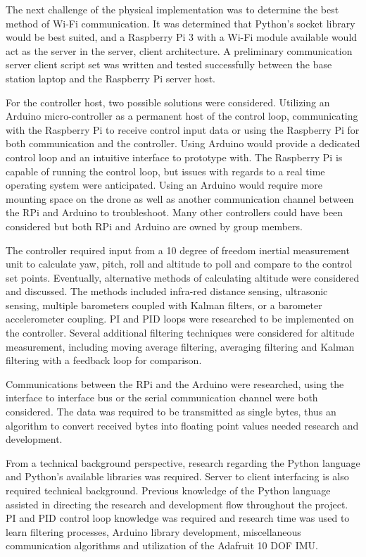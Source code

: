 The next challenge of the physical implementation was to determine the best method of Wi-Fi communication. It was determined that Python's socket library would be best suited, and a Raspberry Pi 3 with a Wi-Fi module available would act as the server in the server, client architecture. A preliminary communication server client script set was written and tested successfully between the base station laptop and the Raspberry Pi server host. 

For the controller host, two possible solutions were considered. Utilizing an Arduino micro-controller as a permanent host of the control loop, communicating with the Raspberry Pi to receive control input data or using the Raspberry Pi for both communication and the controller. Using Arduino would provide a dedicated control loop and an intuitive interface to prototype with. The Raspberry Pi is capable of running the control loop, but issues with regards to a real time operating system were anticipated. Using an Arduino would require more mounting space on the drone as well as another communication channel between the RPi and Arduino to troubleshoot. Many other controllers could have been considered but both RPi and Arduino are owned by group members.

The controller required input from a 10 degree of freedom inertial measurement unit to calculate yaw, pitch, roll and altitude to poll and compare to the control set points. Eventually, alternative methods of calculating altitude were considered and discussed. The methods included infra-red distance sensing, ultrasonic sensing, multiple barometers coupled with Kalman filters, or a barometer accelerometer coupling. PI and PID loops were researched to be implemented on the controller. Several additional filtering techniques were considered for altitude measurement, including moving average filtering, averaging filtering and Kalman filtering with a feedback loop for comparison.

Communications between the RPi and the Arduino were researched, using the interface to interface bus or the serial communication channel were both considered. The data was required to be transmitted as single bytes, thus an algorithm to convert received bytes into floating point values needed research and development.

From a technical background perspective, research regarding the Python language and Python's available libraries was required. Server to client interfacing is also required technical background. Previous knowledge of the Python language assisted in directing the research and development flow throughout the project. PI and PID control loop knowledge was required and research time was used to learn filtering processes, Arduino library development, miscellaneous communication algorithms and utilization of the Adafruit 10 DOF IMU.

